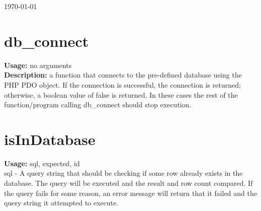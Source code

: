 \begin{titlepage}


{\large \today}\\[3cm] %


 

\vfill %

\end{titlepage}
\tableofcontents


\newpage
\section{db\_connect}
\textbf{Usage:} no arguments \\
\textbf{Description:} a function that connects to the pre-defined database using the PHP PDO object. If the connection is successful, the connection is returned; otherwise, a boolean value of false is returned. In these cases the rest of the function/program calling db\_connect should stop execution.\\

\newpage
\section{isInDatabase}
\textbf{Usage:} sql, expected, id \\
sql - A query string that should be checking if some row already exists 
in the database. The query will be executed and the result and row count
compared. If the query fails for some reason, an error message will return
that it failed and the query string it attempted to execute. \\

